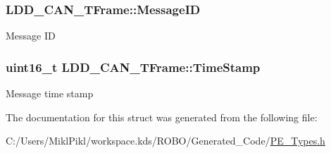 \subsubsection[{Message\+I\+D}]{ L\+D\+D\+\_\+\+C\+A\+N\+\_\+\+T\+Frame\+::\+Message\+I\+D}\label{struct_l_d_d___c_a_n___t_frame_ab6f347f42b51e9ae318e04cdce84c82c}
Message I\+D \hypertarget{struct_l_d_d___c_a_n___t_frame_a9bab04fefdcfc101f718355bc6e20eb4}{}
\subsubsection[{Time\+Stamp}]{\setlength{\rightskip}{0pt plus 5cm}uint16\+\_\+t L\+D\+D\+\_\+\+C\+A\+N\+\_\+\+T\+Frame\+::\+Time\+Stamp}\label{struct_l_d_d___c_a_n___t_frame_a9bab04fefdcfc101f718355bc6e20eb4}
Message time stamp 

The documentation for this struct was generated from the following file\+:\begin{DoxyCompactItemize}
\item 
C\+:/\+Users/\+Mikl\+Pikl/workspace.\+kds/\+R\+O\+B\+O/\+Generated\+\_\+\+Code/\hyperlink{_p_e___types_8h}{P\+E\+\_\+\+Types.\+h}\end{DoxyCompactItemize}
